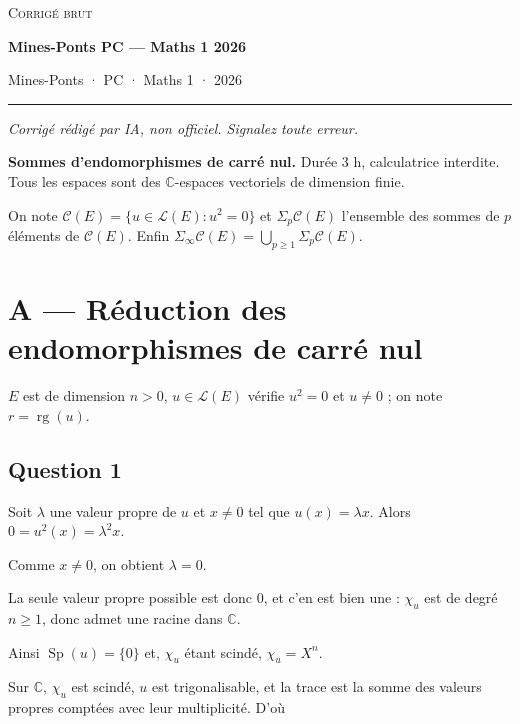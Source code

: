 \documentclass[11pt,a4paper]{article}
\newcommand{\equationajustee}[1]{%
  \sbox{\boiteequation}{$\displaystyle #1$}%
  \ifdim\wd\boiteequation>\linewidth
    \[\resizebox{\linewidth}{!}{\usebox{\boiteequation}}\]%
  \else
    \[#1\]%
  \fi}
\begin{document}
\thispagestyle{plain}
\begin{center}
  {\small\scshape Corrigé brut}\par\smallskip
  {\LARGE\bfseries Mines-Ponts PC — Maths 1 2026\par}\medskip
  {\large Mines-Ponts · PC · Maths 1 · 2026\par}
\end{center}
\vspace{2pt}\hrule\vspace{8pt}

\emph{Corrigé rédigé par IA, non officiel. Signalez toute erreur.}

\textbf{Sommes d'endomorphismes de carré nul.} Durée 3 h, calculatrice interdite. Tous les espaces sont des \(\mathbb C\)-espaces vectoriels de dimension finie.

On note \(\mathcal C(E)=\{u\in\mathcal L(E):u^2=0\}\) et \(\Sigma_p\mathcal C(E)\) l'ensemble des sommes de \(p\) éléments de \(\mathcal C(E)\). Enfin \(\Sigma_\infty\mathcal C(E)=\bigcup_{p\ge1}\Sigma_p\mathcal C(E)\).

\hypertarget{a-ruxe9duction-des-endomorphismes-de-carruxe9-nul}{%
\section{A --- Réduction des endomorphismes de carré nul}\label{a-ruxe9duction-des-endomorphismes-de-carruxe9-nul}}

\(E\) est de dimension \(n>0\), \(u\in\mathcal L(E)\) vérifie \(u^2=0\) et \(u\neq0\) ; on note \(r=\operatorname{rg}(u)\).

\hypertarget{question-1}{%
\subsection{Question 1}\label{question-1}}

Soit \(\lambda\) une valeur propre de \(u\) et \(x\neq0\) tel que \(u(x)=\lambda x\). Alors \(0=u^2(x)=\lambda^2x\).

Comme \(x\neq0\), on obtient \(\lambda=0\).

La seule valeur propre possible est donc \(0\), et c'en est bien une : \(\chi_u\) est de degré \(n\ge1\), donc admet une racine dans \(\mathbb C\).

Ainsi \(\operatorname{Sp}(u)=\{0\}\) et, \(\chi_u\) étant scindé, \(\chi_u=X^n\).

Sur \(\mathbb C\), \(\chi_u\) est scindé, \(u\) est trigonalisable, et la trace est la somme des valeurs propres comptées avec leur multiplicité. D'où
\equationajustee{\boxed{\begin{aligned}{}&\operatorname{Sp}(u)=\{0\},\\ &\operatorname{tr}(u)=0.\end{aligned}}}
\end{document}
